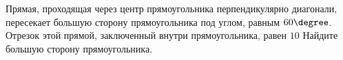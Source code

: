 \begin{ex}
	\begin{condition}
		Прямая, проходящая через центр прямоугольника перпендикулярно диагонали, пересекает большую сторону прямоугольника под углом, равным \( 60\degree\). Отрезок этой прямой, заключенный внутри прямоугольника, равен \( 10  \) Найдите большую сторону прямоугольника.
	\end{condition}
\end{ex}